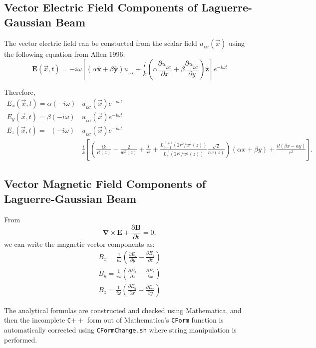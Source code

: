 \documentclass[11pt,letterpaper]{article}
\newcommand{\p}{\partial}
\newcommand{\del}{\boldsymbol\nabla}
\begin{document}
\subsection{Vector Electric Field Components of Laguerre-Gaussian Beam}
The vector electric field can be constucted from the scalar field $u_{_{LG}}(\vec{x})$ using the following equation from Allen 1996:
\begin{equation}\label{eq:uLGEvec}
\mathbf{E} (\vec{x},t) = -i \omega 
\left[ 
(\alpha \mathbf{\hat{x}} + \beta \mathbf{\hat{y}}) u_{_{LG}} 
+\frac{i}{k} \left( \alpha \frac{\partial u_{_{LG}}}{\partial x} + \beta \frac{\partial u_{_{LG}}}{\partial y} \right) \mathbf{\hat{z}} 
	\right] 	e^{-i\omega t}
\end{equation}

Therefore,
\begin{align*}
E_{x}(\vec{x},t)  = \alpha (-i\omega)&  u_{_{LG}}(\vec{x}) e^{-i\omega t}\\
E_{y}(\vec{x},t)  = \beta (-i\omega)&  u_{_{LG}}(\vec{x}) e^{-i\omega t}\\
E_{z}(\vec{x},t)  =\;\;(-i\omega) &u_{_{LG}}(\vec{x}) e^{-i\omega t}\\
& \frac{i}{k} \left[ \left(\frac{ik}{R(z)} - \frac{2}{w^2(z)}  +\frac{|l|}{r^2} 
+ \frac{L^{|l|+1}_{p-1}(2r^2/w^2(z))}{L^{|l|}_{p}(2r^2/w^2(z))}\frac{\sqrt{2}}{r w(z)}
\right)(\alpha x + \beta y)
	+ \frac{ il(\beta x-\alpha y)}{r^2}
	\right] .
\end{align*}
\subsection{Vector Magnetic Field Components of Laguerre-Gaussian Beam}
From 
\begin{equation*}
\del \times \mathbf{E} + \frac{\p \mathbf{B}}{\p t}=0,
\end{equation*}
we can write the magnetic vector components as: 
\begin{align*}
B_x = \frac{1}{i\omega}\left(\frac{\p E_z}{\p y} - \frac{\p E_y}{\p z} \right)
\\
B_y = \frac{1}{i\omega}\left(\frac{\p E_x}{\p z} - \frac{\p E_z}{\p x} \right)
\\
B_z = \frac{1}{i\omega}\left(\frac{\p E_y}{\p x} - \frac{\p E_x}{\p y} \right)
\end{align*}

The analytical formulas are constructed and checked using Mathematica, and then the incomplete \texttt{C$++$} form out of Mathematica's \texttt{CForm} function is automatically corrected using \texttt{CFormChange.sh} where string manipulation is performed. 
\end{document}
